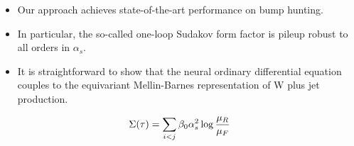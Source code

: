 \begin{itemize}
  \item Our approach achieves state-of-the-art performance on bump hunting.
  \item In particular, the so-called one-loop Sudakov form factor is pileup robust to all orders in $\alpha_s$.
  \item It is straightforward to show that the neural ordinary differential equation couples to the equivariant Mellin-Barnes representation of W plus jet production.
\end{itemize}

\begin{equation}
  \Sigma(\tau) = \sum_{i<j} \beta_0 \alpha_s^2 \log\frac{\mu_R}{\mu_F}
  \label{eq:5}
\end{equation}

